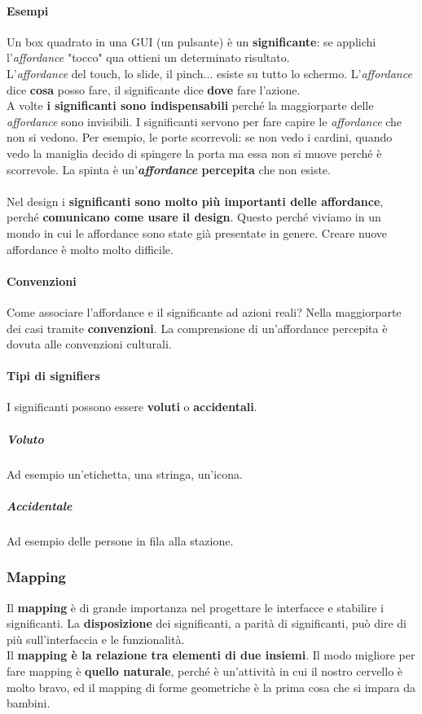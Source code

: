\documentclass[10pt]{article}
\begin{document}
\paragraph{Esempi} Un box quadrato in una GUI (un pulsante) è un \textbf{significante}: se applichi l'\textit{affordance} "tocco" qua ottieni un determinato risultato.\\
L'\textit{affordance} del touch, lo slide, il pinch... esiste su tutto lo schermo. L'\textit{affordance} dice \textbf{cosa} posso fare, il significante dice \textbf{dove} fare l'azione.\\
A volte \textbf{i significanti sono indispensabili} perché la maggiorparte delle \textit{affordance} sono invisibili. I significanti servono per fare capire le \textit{affordance} che non si vedono. Per esempio, le porte scorrevoli: se non vedo i cardini, quando vedo la maniglia decido di spingere la porta ma essa non si muove perché è scorrevole. La spinta è un'\textbf{\textit{affordance} percepita} che non esiste.\\\\
Nel design i \textbf{significanti sono molto più importanti delle affordance}, perché \textbf{comunicano come usare il design}. Questo perché viviamo in un mondo in cui le affordance sono state già presentate in genere. Creare nuove affordance è molto molto difficile.
\paragraph{Convenzioni} Come associare l'affordance e il significante ad azioni reali? Nella maggiorparte dei casi tramite \textbf{convenzioni}. La comprensione di un'affordance percepita è dovuta alle convenzioni culturali.
\paragraph{Tipi di signifiers} I significanti possono essere \textbf{voluti} o \textbf{accidentali}.
\subparagraph{Voluto} Ad esempio un'etichetta, una stringa, un'icona.
\subparagraph{Accidentale} Ad esempio delle persone in fila alla stazione.
\subsubsection{Mapping}
Il \textbf{mapping} è di grande importanza nel progettare le interfacce e stabilire i significanti. La \textbf{disposizione} dei significanti, a parità di significanti, può dire di più sull'interfaccia e le funzionalità.\\
Il \textbf{mapping è la relazione tra elementi di due insiemi}. Il modo migliore per fare mapping è \textbf{quello naturale}, perché è un'attività in cui il nostro cervello è molto bravo, ed il mapping di forme geometriche è la prima cosa che si impara da bambini.
\end{document}
